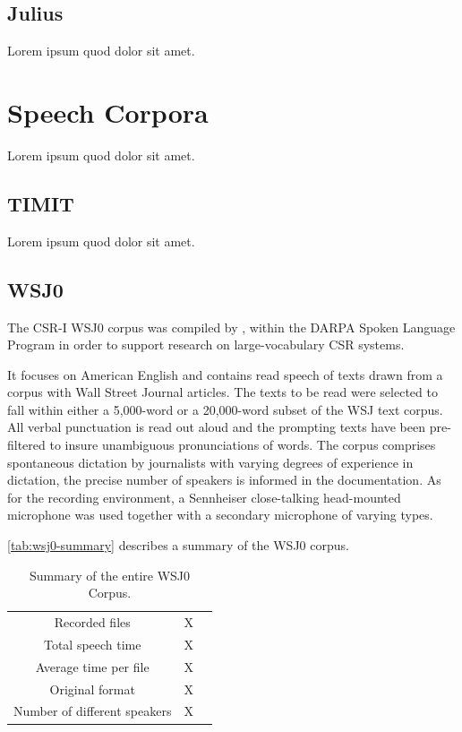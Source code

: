 \subsection{Julius}
Lorem ipsum quod dolor sit amet.

\section{Speech Corpora}
Lorem ipsum quod dolor sit amet.

\subsection{TIMIT}
Lorem ipsum quod dolor sit amet.

\subsection{WSJ0}
The CSR-I WSJ0 corpus was compiled by \citeauthor{Garofolo1993} \cite{Garofolo1993}, within the 
DARPA Spoken Language Program in order to support research on large-vocabulary \ac{CSR} systems.

It focuses on American English and contains read speech of texts drawn from a corpus with Wall 
Street Journal articles. The texts to be read were selected to fall within either a 5,000-word or 
a 20,000-word subset of the WSJ text corpus. All verbal punctuation is read out aloud and the 
prompting texts have been pre-filtered to insure unambiguous pronunciations of words. The corpus 
comprises spontaneous dictation by journalists with varying degrees of experience in dictation, 
the precise number of speakers is informed in the documentation. As for the recording environment, 
a Sennheiser close-talking head-mounted microphone was used together with a secondary microphone of 
varying types. 

\autoref{tab:wsj0-summary} describes a summary of the WSJ0 corpus.

\begin{table}[H]
\caption[Summary of the entire WSJ0 Corpus.]{Summary of the entire WSJ0 Corpus.}
\smallskip
\centering
\begin{tabular}{ccc} \toprule
 Recorded files & X \\
 Total speech time & X \\
 Average time per file & X \\
 Original format & X \\
 Number of different speakers & X \\
 \bottomrule
\end{tabular}
\label{tab:wsj0-summary}
\end{table}

